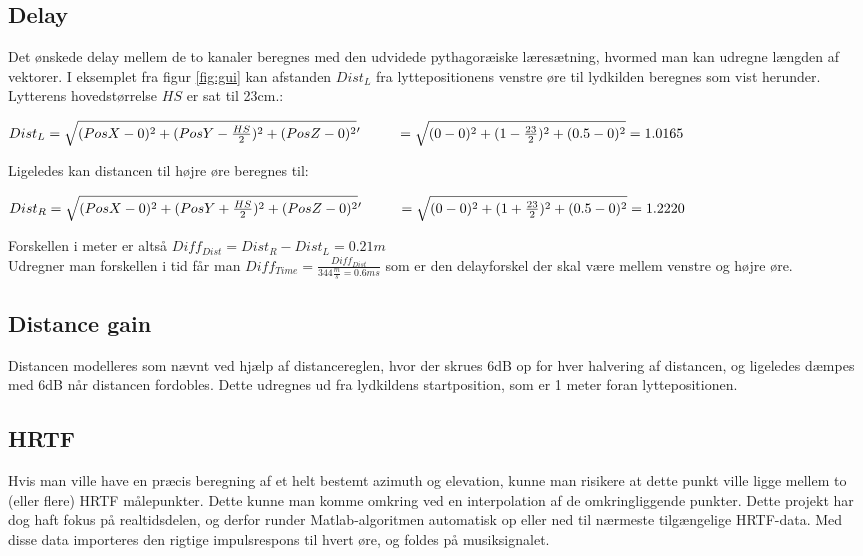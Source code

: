 \subsection{Delay}

Det ønskede delay mellem de to kanaler beregnes med den udvidede pythagoræiske læresætning, hvormed man kan udregne længden af vektorer. I eksemplet fra figur \ref{fig:gui} kan afstanden $Dist_L$ fra lyttepositionens venstre øre til lydkilden beregnes som vist herunder. Lytterens hovedstørrelse $HS$ er sat til 23cm.:

\( Dist_L = \sqrt{(PosX-0)^2+(PosY-\frac{HS}{2})^2+(PosZ-0)^2}\\
 '\hspace{.9cm} = \sqrt{(0-0)^2+(1-\frac{23}{2})^2+(0.5-0)^2} = 1.0165 \)
 
 Ligeledes kan distancen til højre øre beregnes til:
 
 \( Dist_R = \sqrt{(PosX-0)^2+(PosY+\frac{HS}{2})^2+(PosZ-0)^2}\\
'\hspace{.9cm} = \sqrt{(0-0)^2+(1+\frac{23}{2})^2+(0.5-0)^2} = 1.2220 \)

Forskellen i meter er altså \( Diff_{Dist} = Dist_R - Dist_L = 0.21m \) \\
Udregner man forskellen i tid får man \( Diff_{Time} = \frac{Diff_{Dist}}{344\frac{m}{s} = 0.6ms}   \) som er den delayforskel der skal være mellem venstre og højre øre.

\subsection{Distance gain}

Distancen modelleres som nævnt ved hjælp af distancereglen, hvor der skrues 6dB op for hver halvering af distancen, og ligeledes dæmpes med 6dB når distancen fordobles. Dette udregnes ud fra lydkildens startposition, som er 1 meter foran lyttepositionen.

\subsection{HRTF}

Hvis man ville have en præcis beregning af et helt bestemt azimuth og elevation, kunne man risikere at dette punkt ville ligge mellem to (eller flere) HRTF målepunkter. Dette kunne man komme omkring ved en interpolation af de omkringliggende punkter. Dette projekt har dog haft fokus på realtidsdelen, og derfor runder Matlab-algoritmen automatisk op eller ned til nærmeste tilgængelige HRTF-data. Med disse data importeres den rigtige impulsrespons til hvert øre, og foldes på musiksignalet.